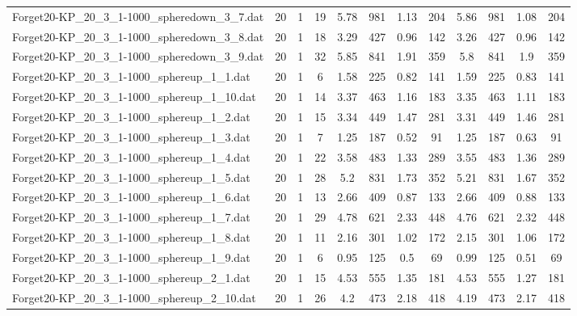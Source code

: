 \begin{sidewaystable}[!ht]
{\begin{tabular}{lccccccccccc}
Forget20-KP\_20\_3\_1-1000\_spheredown\_3\_7.dat & 20 & 1 & 19 & 5.78 & 981 & 1.13 & 204 & 5.86 & 981 &  \textcolor{blue2}{1.08} & 204 \\
Forget20-KP\_20\_3\_1-1000\_spheredown\_3\_8.dat & 20 & 1 & 18 & 3.29 & 427 &  \textcolor{blue2}{0.96} & 142 & 3.26 & 427 &  \textcolor{blue2}{0.96} & 142 \\
Forget20-KP\_20\_3\_1-1000\_spheredown\_3\_9.dat & 20 & 1 & 32 & 5.85 & 841 & 1.91 & 359 & 5.8 & 841 &  \textcolor{blue2}{1.9} & 359 \\
Forget20-KP\_20\_3\_1-1000\_sphereup\_1\_1.dat & 20 & 1 & 6 & 1.58 & 225 &  \textcolor{blue2}{0.82} & 141 & 1.59 & 225 & 0.83 & 141 \\
Forget20-KP\_20\_3\_1-1000\_sphereup\_1\_10.dat & 20 & 1 & 14 & 3.37 & 463 & 1.16 & 183 & 3.35 & 463 &  \textcolor{blue2}{1.11} & 183 \\
Forget20-KP\_20\_3\_1-1000\_sphereup\_1\_2.dat & 20 & 1 & 15 & 3.34 & 449 & 1.47 & 281 & 3.31 & 449 & 1.46 & 281 \\
Forget20-KP\_20\_3\_1-1000\_sphereup\_1\_3.dat & 20 & 1 & 7 & 1.25 & 187 &  \textcolor{blue2}{0.52} & 91 & 1.25 & 187 & 0.63 & 91 \\
Forget20-KP\_20\_3\_1-1000\_sphereup\_1\_4.dat & 20 & 1 & 22 & 3.58 & 483 &  \textcolor{blue2}{1.33} & 289 & 3.55 & 483 & 1.36 & 289 \\
Forget20-KP\_20\_3\_1-1000\_sphereup\_1\_5.dat & 20 & 1 & 28 & 5.2 & 831 & 1.73 & 352 & 5.21 & 831 &  \textcolor{blue2}{1.67} & 352 \\
Forget20-KP\_20\_3\_1-1000\_sphereup\_1\_6.dat & 20 & 1 & 13 & 2.66 & 409 &  \textcolor{blue2}{0.87} & 133 & 2.66 & 409 & 0.88 & 133 \\
Forget20-KP\_20\_3\_1-1000\_sphereup\_1\_7.dat & 20 & 1 & 29 & 4.78 & 621 & 2.33 & 448 & 4.76 & 621 &  \textcolor{blue2}{2.32} & 448 \\
Forget20-KP\_20\_3\_1-1000\_sphereup\_1\_8.dat & 20 & 1 & 11 & 2.16 & 301 & 1.02 & 172 & 2.15 & 301 & 1.06 & 172 \\
Forget20-KP\_20\_3\_1-1000\_sphereup\_1\_9.dat & 20 & 1 & 6 & 0.95 & 125 &  \textcolor{blue2}{0.5} & 69 & 0.99 & 125 & 0.51 & 69 \\
Forget20-KP\_20\_3\_1-1000\_sphereup\_2\_1.dat & 20 & 1 & 15 & 4.53 & 555 & 1.35 & 181 & 4.53 & 555 &  \textcolor{blue2}{1.27} & 181 \\
Forget20-KP\_20\_3\_1-1000\_sphereup\_2\_10.dat & 20 & 1 & 26 & 4.2 & 473 & 2.18 & 418 & 4.19 & 473 &  \textcolor{blue2}{2.17} & 418 \\

\end{tabular}}
\end{sidewaystable}
